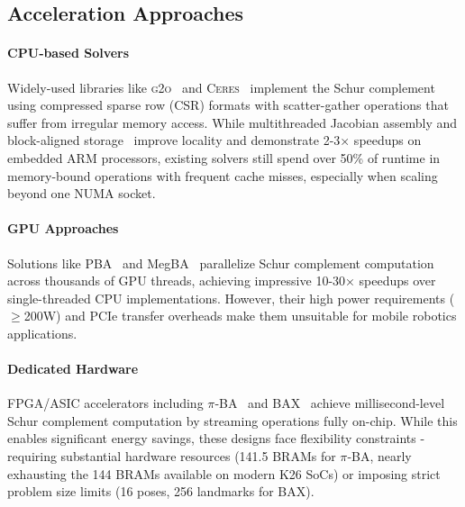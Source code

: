 \subsection{Acceleration Approaches}\label{subsec:acceleration}

\paragraph*{CPU‑based Solvers} Widely‑used libraries like \textsc{g2o}~\cite{kummerle2011g} and 
\textsc{Ceres}~\cite{agarwal2012ceres} implement the Schur complement using compressed sparse row (CSR) formats with 
scatter-gather operations that suffer from irregular memory access. While multithreaded Jacobian assembly and block-aligned
 storage~\cite{wu2011multicore} improve locality and demonstrate 2-3× speedups on embedded ARM processors, existing solvers 
 still spend over 50\% of runtime in memory-bound operations with frequent cache misses, especially when scaling beyond 
 one NUMA socket.

\paragraph*{GPU Approaches} Solutions like PBA~\cite{wu2011multicore} and MegBA~\cite{ren2022megba} parallelize Schur 
complement computation across thousands of GPU threads, achieving impressive 10-30× speedups over single-threaded CPU 
implementations. However, their high power requirements ($\geq$200W) and PCIe transfer overheads make them unsuitable for 
mobile robotics applications.

\paragraph*{Dedicated Hardware} FPGA/ASIC accelerators including $\pi$‑BA~\cite{qin2019pi} and BAX~\cite{sun2020bax} 
achieve millisecond-level Schur complement computation by streaming operations fully on-chip. While this enables 
significant energy savings, these designs face flexibility constraints - requiring substantial hardware resources 
(141.5 BRAMs for $\pi$‑BA, nearly exhausting the 144 BRAMs available on modern K26 SoCs) or imposing strict problem size limits (16 poses, 256 landmarks for BAX).

